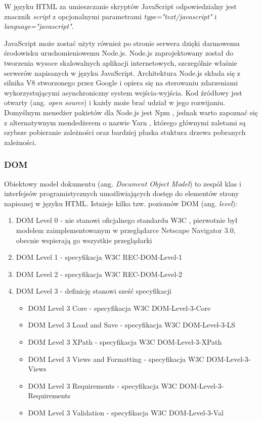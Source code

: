 \documentclass[polish, twoside, 12pt]{mwart}
\begin{document}
W języku HTML za umieszczanie skryptów JavaScript odpowiedzialny jest znacznik \emph{script} z opcjonalnymi parametrami \emph{type="text/javascript"} i \emph{language="javascript"}.

JavaScript może zostać użyty również po stronie serwera dzięki darmowemu środowisku uruchomieniowemu Node.js\cite{node.js}. Node.js zaprojektowany został do tworzenia wysoce skalowalnych aplikacji internetowych, szczególnie właśnie serwerów napisanych w języku JavaScript. Architektura Node.js składa się z silnika V8 \cite{v8} stworzonego przez Google i opiera się na sterowaniu zdarzeniami wykorzystującymi asynchroniczny system wejścia-wyjścia. Kod źródłowy jest otwarty (ang. \emph{open source}) i każdy może brać udział w jego rozwijaniu. Domyślnym menedżer pakietów dla Node.js jest Npm \cite{npm}, jednak warto zapoznać się z alternatywnym mendedżerem o nazwie Yarn \cite{yarn}, którego głównymi zaletami są szybsze pobieranie zależności oraz bardziej płaska stuktura drzewa pobranych zależności.

\subsubsection{DOM} \label{dom}

Obiektowy model dokumentu (ang. \emph{Document Object Model}) to zespół klas i interfejsów programistycznych umożliwiających dostęp do elementów strony napisanej w języku HTML. Istnieje kilka tzw. poziomów DOM (ang. \emph{level}):

\begin{enumerate}
  \item DOM Level 0 - nie stanowi oficjalnego standardu W3C \cite{w3c}, pierwotnie był modelem zaimplementowanym w przeglądarce Netscape Navigator 3.0, obecnie wspierają go wszystkie przeglądarki
  \item DOM Level 1 - specyfikacja W3C REC-DOM-Level-1 \cite{w3c-rec-dom-level-1} 
  \item DOM Level 2 - specyfikacja W3C REC-DOM-Level-2 \cite{w3c-rec-dom-level-2} 
  \item DOM Level 3 - definicję stanowi sześć specyfikacji
  \begin{itemize}
    \item DOM Level 3 Core - specyfikacja W3C DOM-Level-3-Core \cite{w3c-rec-dom-level-3-core}
    \item DOM Level 3 Load and Save - specyfikacja W3C DOM-Level-3-LS \cite{w3c-rec-dom-level-3-ls}
    \item DOM Level 3 XPath - specyfikacja W3C DOM-Level-3-XPath \cite{w3c-rec-dom-level-3-xpath}
    \item DOM Level 3 Views and Formatting - specyfikacja W3C DOM-Level-3-Views \cite{w3c-rec-dom-level-3-views}
    \item DOM Level 3 Requirements - specyfikacja W3C DOM-Level-3-Requirements \cite{w3c-rec-dom-level-3-requirements}
    \item DOM Level 3 Validation - specyfikacja W3C DOM-Level-3-Val \cite{w3c-rec-dom-level-3-val}
  \end{itemize}
\end{enumerate}
\end{document}
